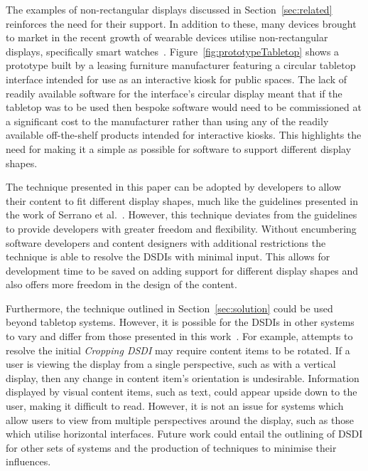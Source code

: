 \documentclass[twocolumn,compsoc]{cvm}
\begin{document}
{The examples of non-rectangular displays discussed in Section~\ref{sec:related}  reinforces the need for their support.
In addition to these, many devices brought to market in the recent growth of wearable devices utilise non-rectangular displays, specifically smart watches~\cite{Jung2016}.
Figure~\ref{fig:prototypeTabletop} shows a prototype built by a leasing furniture manufacturer featuring a circular tabletop interface intended for use as an interactive kiosk for public spaces.
The lack of readily available software for the interface's circular display meant that if the tabletop was to be used then bespoke software would need to be commissioned at a significant cost to the manufacturer rather than using any of the readily available off-the-shelf products intended for interactive kiosks.
This highlights the need for making it a simple as possible for software to support different display shapes.

The technique presented in this paper can be adopted by developers to allow their content to fit different display shapes, much like the guidelines presented in the work of Serrano et al.~\cite{Serrano2016,Serrano2017}.
However, this technique deviates from the guidelines to provide developers with greater freedom and flexibility.
Without encumbering software developers and content designers with additional restrictions the technique is able to resolve the \acp{DSDI} with minimal input.
This allows for development time to be saved on adding support for different display shapes and also offers more freedom in the design of the content.

Furthermore, the technique outlined in Section~\ref{sec:solution} could be used beyond tabletop systems.
However, it is possible for the \acp{DSDI} in other systems to vary and differ from those presented in this work~\cite{Serrano2017}. 
For example, attempts to resolve the initial {\emph{Cropping \ac{DSDI}}} may require content items to be rotated.
If a user is viewing the display from a single perspective, such as with a vertical display, then any change in content item's orientation is undesirable.
Information displayed by visual content items, such as text, could appear upside down to the user, making it difficult to read.
However, it is not an issue for systems which allow users to view from multiple perspectives around the display, such as those which utilise horizontal interfaces.
Future work could entail the outlining of \ac{DSDI} for other sets of systems and the production of techniques to minimise their influences.

}
\end{document}
